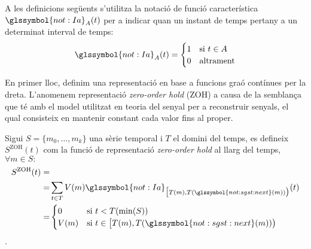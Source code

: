 A les definicions següents s'utilitza la notació de funció
característica $\glssymbol{not:Ia}_A(t)$ per a indicar quan un instant
de temps pertany a un determinat interval de temps:
\[
\glssymbol{not:Ia}_A(t) = 
   \begin{cases}
      1 & \text{si } t\in A \\
      0 & \text{altrament}
    \end{cases}
\]



En primer lloc, definim una representació en base a funcions graó
contínues per la dreta. L'anomenem representació \emph{zero-order
  hold} (ZOH) a causa de la semblança que té amb el model utilitzat en
teoria del senyal per a reconstruir senyals, el qual consisteix en mantenir
constant cada valor fins al proper.
\begin{definition}
  \label{def:sgst:zoh}
  Sigui $S=\{m_0,\ldots,m_k\}$ una sèrie temporal i $T$ el domini del
  temps, es defineix $S^\text{ZOH}(t)$ com la funció de representació
  \emph{zero-order hold} al llarg del temps, $\forall m \in S:$
  \begin{align*}
    S^\text{ZOH}(t) = &  \\
    = & \sum_{t\in T} V(m) \glssymbol{not:Ia}_{\big[T(m), T(\glssymbol{not:sgst:next}(m)) \big)}(t)\\
    = & \begin{cases}
      0 & \text{si }  t<T(\min(S)) \\
      V(m) & \text{si } t\in
      \big[T(m),T(\glssymbol{not:sgst:next}(m))\big)
    \end{cases}
         \end{align*}.
\end{definition}



